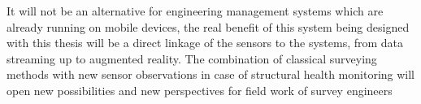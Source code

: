 It will not be an alternative for engineering management systems which are already running on mobile devices, the real benefit of this system being designed with this thesis will be a direct linkage of the sensors to the systems, from data streaming up to augmented reality. The combination of classical surveying methods with new sensor observations in case of structural health monitoring will open new possibilities and new perspectives for field work of survey engineers\\
